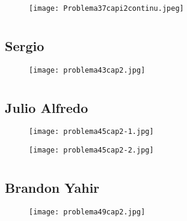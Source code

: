 \documentclass[12pt]{article}
\begin{document}
\begin{figure}[htb] 
\centering \texttt{[image: Problema37capi2continu.jpeg]} 
\end{figure}
\newpage

\section{ }
\subsection{{} Sergio}

\begin{figure}[htb] 
\centering \texttt{[image: problema43cap2.jpg]} 
\end{figure}
\newpage

\section{ }
\subsection{{} Julio Alfredo}

\begin{figure}[htb] 
\centering \texttt{[image: problema45cap2-1.jpg]} 
\end{figure}
\newpage

\begin{figure}[htb] 
\centering \texttt{[image: problema45cap2-2.jpg]} 
\end{figure}
\newpage

\section{ }
\subsection{{} Brandon Yahir}

\begin{figure}[htb] 
\centering \texttt{[image: problema49cap2.jpg]} 
\end{figure}
\newpage

\section{ }
\end{document}
